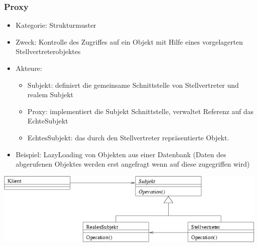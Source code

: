 \documentclass[11pt, fleqn, a4paper, leqno]{scrartcl} %
\begin{document}
		\subsubsection{Proxy}
			\begin{itemize}
				\item Kategorie: Strukturmuster
				\item Zweck: Kontrolle des Zugriffes auf ein Objekt mit Hilfe eines vorgelagerten Stellvertreterobjektes
				\item Akteure: 
					\begin{itemize}
						\item Subjekt: definiert die gemeinsame Schnittstelle von Stellvertreter und realem Subjekt
						\item Proxy: implementiert die Subjekt Schnittstelle, verwaltet Referenz auf das EchteSubjekt
						\item EchtesSubjekt: das durch den Stellvertreter repräsentierte Objekt.
					\end{itemize}
				\item Beispiel: LazyLoading von Objekten aus einer Datenbank (Daten des abgerufenen Objektes werden erst angefragt wenn auf diese zugegriffen wird)
			\end{itemize}
			\includegraphics[scale=0.7]{images/proxy.png}
			\newpage
\end{document}
